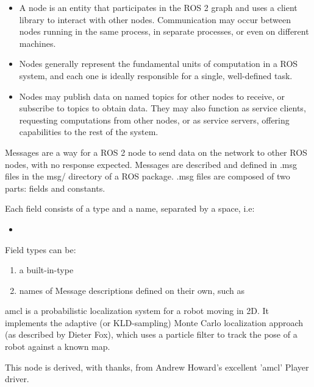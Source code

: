 {
\begin{itemize}
\item A node is an entity that participates in the ROS 2 graph and uses a client library to interact with other nodes. Communication may occur between nodes running in the same process, in separate processes, or even on different machines.

\item Nodes generally represent the fundamental units of computation in a ROS system, and each one is ideally responsible for a single, well-defined task.

\item Nodes may publish data on named topics for other nodes to receive, or subscribe to topics to obtain data. They may also function as service clients, requesting computations from other nodes, or as service servers, offering capabilities to the rest of the system.
\end{itemize}
}


{
	Messages are a way for a ROS 2 node to send data on the network to other ROS nodes, with no response expected. Messages are described and defined in .msg files in the msg/ directory of a ROS package. .msg files are composed of two parts: fields and constants. \cite{Macenski:2023}
	
	Each field consists of a type and a name, separated by a space, i.e:
\begin{itemize}
	\item {}
\end{itemize}

	

Field types can be:
\begin{enumerate}
	\item a built-in-type

	\item names of Message descriptions defined on their own, such as 
\end{enumerate}
}




{
	amcl is a probabilistic localization system for a robot moving in 2D. It implements the adaptive (or KLD-sampling) Monte Carlo localization approach (as described by Dieter Fox), which uses a particle filter to track the pose of a robot against a known map.\cite{Macenski:2022}
	
	This node is derived, with thanks, from Andrew Howard's excellent 'amcl' Player driver.
}


